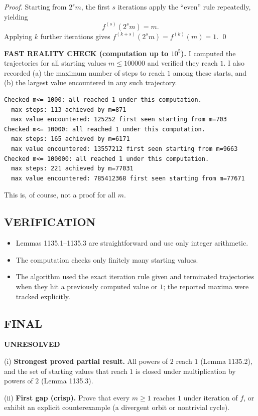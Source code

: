\emph{Proof.}
Starting from $2^s m$, the first $s$ iterations apply the ``even'' rule repeatedly, yielding
\[
 f^{(s)}(2^s m)=m.
\]
Applying $k$ further iterations gives $f^{(k+s)}(2^s m)=f^{(k)}(m)=1$.
\qed

\textbf{FAST REALITY CHECK (computation up to $10^5$).}
I computed the trajectories for all starting values $m\le 100000$ and verified they reach $1$.
I also recorded (a) the maximum number of steps to reach $1$ among these starts, and (b) the largest value encountered in any such trajectory.
\begin{verbatim}
Checked m<= 1000: all reached 1 under this computation.
  max steps: 113 achieved by m=871
  max value encountered: 125252 first seen starting from m=703
Checked m<= 10000: all reached 1 under this computation.
  max steps: 165 achieved by m=6171
  max value encountered: 13557212 first seen starting from m=9663
Checked m<= 100000: all reached 1 under this computation.
  max steps: 221 achieved by m=77031
  max value encountered: 785412368 first seen starting from m=77671
\end{verbatim}
This is, of course, not a proof for all $m$.

\subsection*{VERIFICATION}
\begin{itemize}
\item Lemmas 1135.1--1135.3 are straightforward and use only integer arithmetic.
\item The computation checks only finitely many starting values.
\item The algorithm used the exact iteration rule given and terminated trajectories when they hit a previously computed value or $1$; the reported maxima were tracked explicitly.
\end{itemize}

\subsection*{FINAL}
\textbf{UNRESOLVED}

(i) \textbf{Strongest proved partial result.}
All powers of $2$ reach $1$ (Lemma 1135.2), and the set of starting values that reach $1$ is closed under multiplication by powers of $2$ (Lemma 1135.3).

(ii) \textbf{First gap (crisp).}
Prove that every $m\ge 1$ reaches $1$ under iteration of $f$, or exhibit an explicit counterexample (a divergent orbit or nontrivial cycle).

